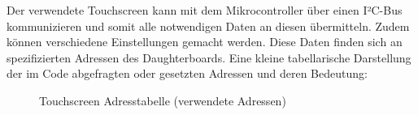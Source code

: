 Der verwendete Touchscreen kann mit dem Mikrocontroller über einen I²C-Bus kommunizieren und somit alle notwendigen Daten an diesen übermitteln.
Zudem können verschiedene Einstellungen gemacht werden.
Diese Daten finden sich an spezifizierten Adressen des Daughterboards.
Eine kleine tabellarische Darstellung der im Code abgefragten oder gesetzten Adressen und deren Bedeutung:
\medskip
\begin{figure}[h!]
	\centering
	
	\caption{Touchscreen Adresstabelle (verwendete Adressen)}
	\label{ts-address_table}
\end{figure}
